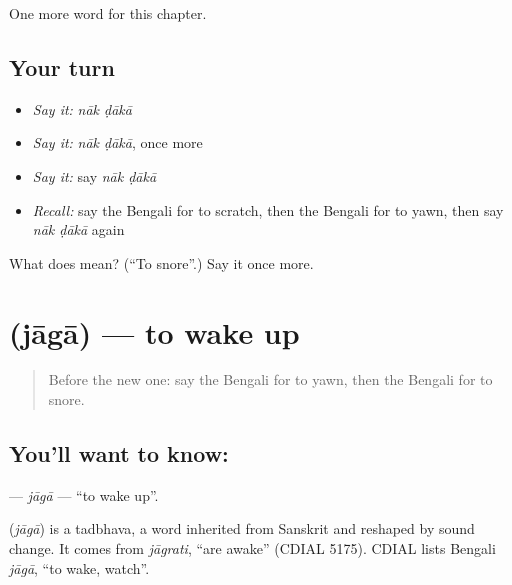 \begin{grammarlens}[title={What you've built}]
One more word for this chapter.
\end{grammarlens}

\subsection*{Your turn}
\begin{itemize}
\raggedright
  \item \emph{Say it:} \emph{nāk ḍākā}
  \item \emph{Say it:} \emph{nāk ḍākā}, once more
  \item \emph{Say it:} say \emph{nāk ḍākā}
  \item \emph{Recall:} say the Bengali for to scratch, then the Bengali for to yawn, then say \emph{nāk ḍākā} again
\end{itemize}

\begin{tcolorbox}[breakable,colback=teal!4,colframe=teal!35!black,title={Before you move on}]
What does   mean? (\textquotedblleft{}To snore\textquotedblright{}.) Say it once more.
\end{tcolorbox}
\section[\texorpdfstring{\bn{জাগা} (jāgā)}{জাগা (jāgā)}]{ (jāgā) — to wake up}

\label{lesson:BN-C183-jaga}



\begin{quote}
Before the new one: say the Bengali for to yawn, then the Bengali for to snore.
\end{quote}

\subsection*{You'll want to know: }
\textbf{} — \emph{jāgā} — \textquotedblleft{}to wake up\textquotedblright{}.

\begin{cousinweb}
\textbf{} (\emph{jāgā}) is a tadbhava, a word inherited from Sanskrit and reshaped by sound change. It comes from \emph{jāgrati}, \textquotedblleft{}are awake\textquotedblright{} (CDIAL 5175). CDIAL lists Bengali \emph{jāgā}, \textquotedblleft{}to wake, watch\textquotedblright{}.
\end{cousinweb}

